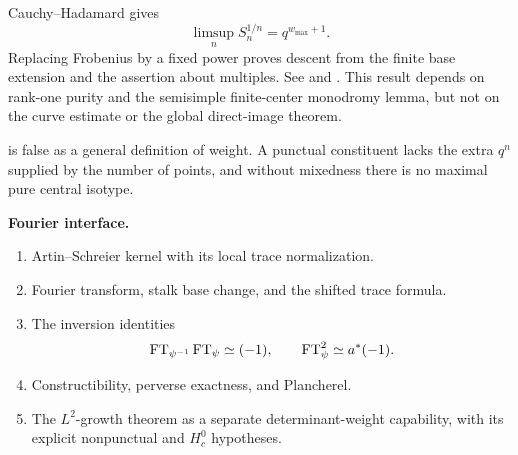 \begin{foundation}
Cauchy--Hadamard gives
\[
 \limsup_n S_n^{1/n}=q^{w_{\max}+1}.
\]
Replacing Frobenius by a fixed power proves descent from the finite base
extension and the assertion about multiples.  See
\cite[Chapter~I, Sections~2.12--3.2]{KiehlWeissauer} and
\cite{StanfordL24}.  This result depends on rank-one purity and the
semisimple finite-center monodromy lemma, but not on the curve estimate
or the global direct-image theorem.
\end{foundation}

\begin{warning}
\label{warn:l2-needs-mixed}
 is false as a general definition of weight.
A punctual constituent lacks the extra \(q^n\) supplied by the number
of points, and without mixedness there is no maximal pure central
isotype.
\end{warning}

\begin{formalization}
\label{form:fourier-interface}
\textbf{Fourier interface.}
\begin{enumerate}
\item Artin--Schreier kernel with its local trace normalization.
\item Fourier transform, stalk base change, and the shifted trace
formula.
\item The inversion identities
\[
 \operatorname{FT}_{\psi^{-1}}\operatorname{FT}_\psi\simeq(-1),
 \qquad
 \operatorname{FT}_\psi^2\simeq a^*(-1).
\]
\item Constructibility, perverse exactness, and Plancherel.
\item The \(L^2\)-growth theorem as a separate determinant-weight
capability, with its explicit nonpunctual and \(H_c^0\) hypotheses.
\end{enumerate}
\end{formalization}

